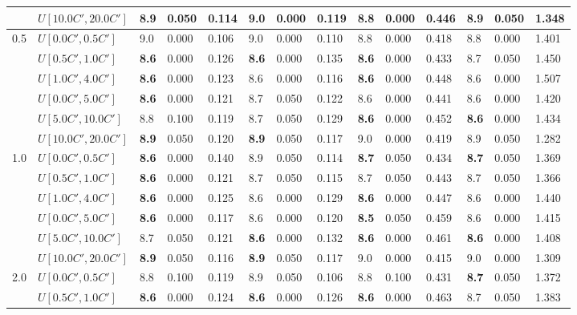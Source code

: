 \begin{table}[h]
{\begin{tabular}{|l|l||l|l|l||l|l|l||l|l|l||l|l|l|}
       & $U[10.0C',20.0C']$ & \textbf{8.9} & 0.050 & 0.114 & 9.0 & 0.000 & 0.119 & \textbf{8.8} & 0.000 & 0.446 & 8.9 & 0.050 & 1.348 \\
      \hline\hline
      \multirow{6}{*}{0.5} & $U[0.0C',0.5C']$ & 9.0 & 0.000 & 0.106 & 9.0 & 0.000 & 0.110 & 8.8 & 0.000 & 0.418 & 8.8 & 0.000 & 1.401 \\
       & $U[0.5C',1.0C']$ & \textbf{8.6} & 0.000 & 0.126 & \textbf{8.6} & 0.000 & 0.135 & \textbf{8.6} & 0.000 & 0.433 & 8.7 & 0.050 & 1.450 \\
       & $U[1.0C',4.0C']$ & \textbf{8.6} & 0.000 & 0.123 & 8.6 & 0.000 & 0.116 & \textbf{8.6} & 0.000 & 0.448 & 8.6 & 0.000 & 1.507 \\
       & $U[0.0C',5.0C']$ & \textbf{8.6} & 0.000 & 0.121 & 8.7 & 0.050 & 0.122 & 8.6 & 0.000 & 0.441 & 8.6 & 0.000 & 1.420 \\
       & $U[5.0C',10.0C']$ & 8.8 & 0.100 & 0.119 & 8.7 & 0.050 & 0.129 & \textbf{8.6} & 0.000 & 0.452 & \textbf{8.6} & 0.000 & 1.434 \\
       & $U[10.0C',20.0C']$ & \textbf{8.9} & 0.050 & 0.120 & \textbf{8.9} & 0.050 & 0.117 & 9.0 & 0.000 & 0.419 & 8.9 & 0.050 & 1.282 \\
      \hline\hline
      \multirow{6}{*}{1.0} & $U[0.0C',0.5C']$ & \textbf{8.6} & 0.000 & 0.140 & 8.9 & 0.050 & 0.114 & \textbf{8.7} & 0.050 & 0.434 & \textbf{8.7} & 0.050 & 1.369 \\
       & $U[0.5C',1.0C']$ & \textbf{8.6} & 0.000 & 0.121 & 8.7 & 0.050 & 0.115 & 8.7 & 0.050 & 0.443 & 8.7 & 0.050 & 1.366 \\
       & $U[1.0C',4.0C']$ & \textbf{8.6} & 0.000 & 0.125 & 8.6 & 0.000 & 0.129 & \textbf{8.6} & 0.000 & 0.447 & 8.6 & 0.000 & 1.440 \\
       & $U[0.0C',5.0C']$ & \textbf{8.6} & 0.000 & 0.117 & 8.6 & 0.000 & 0.120 & \textbf{8.5} & 0.050 & 0.459 & 8.6 & 0.000 & 1.415 \\
       & $U[5.0C',10.0C']$ & 8.7 & 0.050 & 0.121 & \textbf{8.6} & 0.000 & 0.132 & \textbf{8.6} & 0.000 & 0.461 & \textbf{8.6} & 0.000 & 1.408 \\
       & $U[10.0C',20.0C']$ & \textbf{8.9} & 0.050 & 0.116 & \textbf{8.9} & 0.050 & 0.117 & 9.0 & 0.000 & 0.415 & 9.0 & 0.000 & 1.309 \\
      \hline\hline
      \multirow{6}{*}{2.0} & $U[0.0C',0.5C']$ & 8.8 & 0.100 & 0.119 & 8.9 & 0.050 & 0.106 & 8.8 & 0.100 & 0.431 & \textbf{8.7} & 0.050 & 1.372 \\
       & $U[0.5C',1.0C']$ & \textbf{8.6} & 0.000 & 0.124 & \textbf{8.6} & 0.000 & 0.126 & \textbf{8.6} & 0.000 & 0.463 & 8.7 & 0.050 & 1.383 \\

\end{tabular}}
\end{table}
